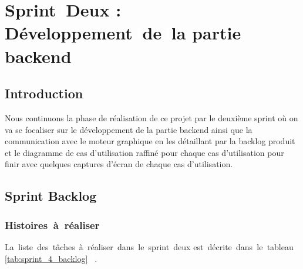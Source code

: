 \graphicspath{{./chapitres/chapitre5/figures/}}
\setcounter{mtc}{4}
\chapter{Sprint\textcolor{white}{J}Deux : Développement\textcolor{white}{J}de\textcolor{white}{J}la partie backend }
\minitoc
\newpage
\section*{Introduction}
Nous continuons la phase de réalisation de ce projet par le deuxième sprint où on va se focaliser sur le développement de la partie backend ainsi que la communication avec le moteur graphique en les détaillant par la backlog produit et le diagramme de cas d’utilisation raffiné pour chaque cas d’utilisation pour finir avec quelques captures d’écran de chaque cas d’utilisation.

\section{Sprint  Backlog}
\subsection{Histoires\textcolor{white}{J}\`a\textcolor{white}{J}r\'ealiser}

La\textcolor{white}{J}liste\textcolor{white}{J}des\textcolor{white}{J}tâches\textcolor{white}{J}à\textcolor{white}{J}réaliser\textcolor{white}{J}dans\textcolor{white}{J}le\textcolor{white}{J}sprint\textcolor{white}{J}deux est\textcolor{white}{J}décrite\textcolor{white}{J}dans\textcolor{white}{J}le\textcolor{white}{J}tableau \ref{tab:sprint_4_backlog} \textcolor{white}{J}.


